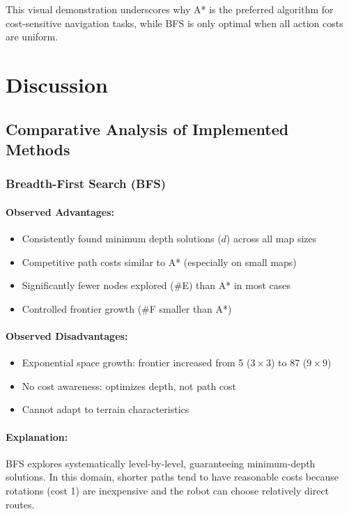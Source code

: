 \documentclass[11pt,a4paper]{article}
\begin{document}
This visual demonstration underscores why A* is the preferred algorithm for cost-sensitive navigation tasks, while BFS is only optimal when all action costs are uniform.


\section{Discussion}

\subsection{Comparative Analysis of Implemented Methods}

\subsubsection{Breadth-First Search (BFS)}

\paragraph{Observed Advantages:}
\begin{itemize}[leftmargin=1.5cm,itemsep=0.1em]
    \item Consistently found minimum depth solutions ($d$) across all map sizes
    \item Competitive path costs similar to A* (especially on small maps)
    \item Significantly fewer nodes explored (\#E) than A* in most cases
    \item Controlled frontier growth (\#F smaller than A*)
\end{itemize}

\paragraph{Observed Disadvantages:}
\begin{itemize}[leftmargin=1.5cm,itemsep=0.1em]
    \item Exponential space growth: frontier increased from 5 ($3\times3$) to 87 ($9\times9$)
    \item No cost awareness: optimizes depth, not path cost
    \item Cannot adapt to terrain characteristics
\end{itemize}

\paragraph{Explanation:}
BFS explores systematically level-by-level, guaranteeing minimum-depth solutions. In this domain, shorter paths tend to have reasonable costs because rotations (cost 1) are inexpensive and the robot can choose relatively direct routes.
\end{document}
